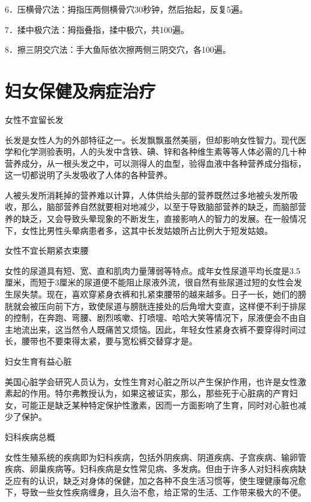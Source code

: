 \documentclass[12pt,UTF8,openany]{ctexbook}
\begin{document}
6．压横骨穴法：拇指压两侧横骨穴30秒钟，然后抬起，反复5遍。

7．揉中极穴法：拇指叠指，揉中极穴，共100遍。

8．擦三阴交穴法：手大鱼际依次擦两侧三阴交穴，各100遍。





\chapter{妇女保健及病症治疗}


女性不宜留长发


长发是女性人为的外部特征之一。长发飘飘虽然美丽，但却影响女性智力。现代医学和化学测验表明，人的头发中含铁、碘、锌和各种维生素等等人体必需的几十种营养成分，从一根头发之中，可以测得人的血型，验得血液中各种营养成分指标，这一切都说明了头发吸收了人体的各种营养。

人被头发所消耗掉的营养难以计算，人体供给头部的营养既然过多地被头发所吸收，那么，脑部营养自然就要相对地减少，以至于导致脑部营养的缺乏，而脑部营养的缺乏，又会导致头晕现象的不断发生，直接影响人的智力的发展。在一般情况下，女性比男性头晕病患者多，这其中长发姑娘所占比例大于短发姑娘。





女性不宜长期紧衣束腰


女性的尿道具有短、宽、直和肌肉力量薄弱等特点。成年女性尿道平均长度是3.5厘米，而短于3厘米的尿道便不能阻止尿液外流，很自然有些尿道过短的女性会发生尿失禁。现在，喜欢穿紧身衣裤和扎紧束腰带的越来越多。日子一长，她们的膀胱就会被压向前下方，致使尿道与膀胱连接处的后角增大变直，这样便不利于排尿的控制，在奔跑、弯腰、剧烈咳嗽、打喷嚏、哈哈大笑等情况下，尿液便会不由自主地流出来，这当然令人既痛苦又烦恼。因此，年轻女性紧身衣裤不要穿得时间过长，腰带也不要束得太紧，要与宽松裤交替穿才是。





妇女生育有益心脏


美国心脏学会研究人员认为，女性生育对心脏之所以产生保护作用，也许是女性激素起的作用。特尔弗教授认为，如果这被证实，那么，那些死于心脏病的产育妇女，可能正是缺乏某种特定保护性激素，因而一方面影响了生育，同时对心脏也减少了保护。





妇科疾病总概


女性生殖系统的疾病即为妇科疾病，包括外阴疾病、阴道疾病、子宫疾病、输卵管疾病、卵巢疾病等。妇科疾病是女性常见病、多发病。但由于许多人对妇科疾病缺乏应有的认识，缺乏对身体的保健，加之各种不良生活习惯等，使生理健康每况愈下，导致一些女性疾病缠身，且久治不愈，给正常的生活、工作带来极大的不便。
\end{document}
